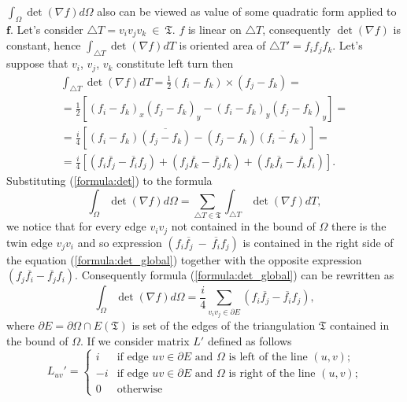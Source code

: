 \documentclass{article}
\newcommand{\conjugate}{\overline}
\begin{document}
$\int_{\Omega} \det(\nabla f) d\Omega$ also can be viewed as value of some quadratic form applied to $\mathbf{f}$. Let's consider $\triangle T = v_i v_j v_k~\in~\mathfrak{T}$. $f$ is linear on $\triangle T$, consequently 
$\det (\nabla f)$ is constant, hence $\int_{\triangle T} \det (\nabla f) dT$ is oriented area of $\triangle T' = f_i f_j f_k$. Let's suppose that $v_i$, $v_j$, $v_k$ constitute left turn then
\begin{multline}
\label{formula:det}
  \int_{\triangle T} \det (\nabla f) dT = \frac{1}{2} (f_i - f_k) \times (f_j - f_k) = \\
  = \frac{1}{2} \left[(f_i - f_k)_x (f_j - f_k)_y - (f_i - f_k)_y (f_j - f_k)_y \right] = \\
  = \frac{i}{4} \left[ (f_i - f_k)\conjugate{(f_j - f_k)} - (f_j - f_k) \conjugate{(f_i - f_k)} \right] = \\
  = \frac{i}{4} \left[ (f_i \conjugate{f_j} - \conjugate{f_i} f_j) + (f_j \conjugate{f_k} - \conjugate{f_j} f_k) + (f_k \conjugate{f_i} - \conjugate{f_k} f_i) \right].  
\end{multline}
Substituting (\ref{formula:det}) to the formula
\begin{equation}
\label{formula:det_global}
  \int_{\Omega} \det {\left( \nabla f \right) } d\Omega = \sum_{\triangle T \in \mathfrak{T}}{ \int_{\triangle T} \det{ \left(\nabla f \right) } dT},
\end{equation}
we notice that for every edge $v_i v_j$ not contained in the bound of $\Omega$ there is the twin edge $v_j v_i$ and so expression $(f_i \conjugate{f_j}~-~\conjugate{f_i} f_j)$ is contained in the right side of 
the equation (\ref{formula:det_global}) together with the opposite expression $(f_j \conjugate{f_i} - \conjugate{f_j} f_i)$. Consequently formula (\ref{formula:det_global}) can be rewritten as
\begin{equation}
\label{formula:det_over_edges}
  \int_{\Omega} \det {\left( \nabla f \right) } d\Omega = \frac{i}{4} \sum_{v_i v_j \in \partial E}{(f_i \conjugate{f_j} - \conjugate{f_i} f_j)},
\end{equation}
where $\partial E = \partial \Omega \cap E(\mathfrak{T})$ is set of the edges of the triangulation $\mathfrak{T}$ contained in the bound of $\Omega$. If we consider matrix $L'$ defined as follows 
\begin{equation*}
  L_{uv}' = \begin{cases}
    i & \text{if edge $uv \in \partial E$ and $\Omega$ is left of the line $(u, v)$;} \\ 
    -i & \text{if edge $uv \in \partial E$ and $\Omega$ is right of the line $(u, v)$;} \\ 
    0 & \text{otherwise}
  \end{cases}
\end{equation*}
\end{document}
